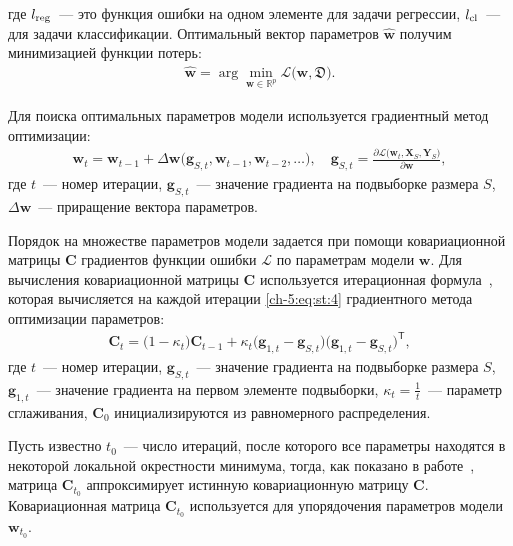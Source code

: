 где $l_{\text{\text{reg}}}$~--- это функция ошибки на одном элементе для задачи регрессии, $l_{\text{\text{cl}}}$~--- для задачи классификации.
Оптимальный вектор параметров $\hat{\textbf{w}}$ получим минимизацией функции потерь:
\[
\label{ch-5:eq:st:0:1}
\begin{aligned}
\hat{\textbf{w}} = \arg \min_{\textbf{w}\in\mathbb{R}^{p}} \mathcal{L}\bigr(\textbf{w}, \mathfrak{D}\bigr).
\end{aligned}
\]

Для поиска оптимальных параметров модели используется градиентный метод оптимизации:
\[
\label{ch-5:eq:st:4}
\begin{aligned}
\textbf{w}_{t} = \textbf{w}_{t-1} + \Delta\textbf{w}\bigr(\textbf{g}_{S,t}, \textbf{w}_{t-1}, \textbf{w}_{t-2}, \ldots\bigr), \quad \textbf{g}_{S,t}=\frac{\partial \mathcal{L}\bigr(\textbf{w}_{t}, \textbf{X}_{S}, \textbf{Y}_{S}\bigr)}{\partial \textbf{w}},
\end{aligned}
\]
где $t$~--- номер итерации, $\textbf{g}_{S,t}$~--- значение градиента на подвыборке размера $S$, $\Delta\textbf{w}$~--- приращение вектора параметров.
 
 
Порядок на множестве параметров модели задается при помощи ковариационной матрицы $\textbf{C}$ градиентов функции ошибки $\mathcal{L}$ по параметрам модели $\textbf{w}$. Для вычисления ковариационной матрицы $\textbf{C}$ используется итерационная формула~\cite{Chunyan2016}, которая вычисляется на каждой итерации \eqref{ch-5:eq:st:4} градиентного метода оптимизации параметров:
\[
\label{ch-5:eq:st:5}
\begin{aligned}
\textbf{C}_t = \bigr(1-\kappa_t\bigr)\textbf{C}_{t-1}+\kappa_t\bigr(\textbf{g}_{1,t}-\textbf{g}_{S,t}\bigr)\bigr(\textbf{g}_{1,t}-\textbf{g}_{S,t}\bigr)^{\mathsf{T}},
\end{aligned}
\]
 где $t$~--- номер итерации, $\textbf{g}_{S,t}$~--- значение градиента на подвыборке размера $S$, $\textbf{g}_{1,t}$~--- значение градиента на первом элементе подвыборки, $\kappa_t=\frac{1}{t}$~--- параметр сглаживания, $\textbf{C}_0$ инициализируются из равномерного распределения.
 
Пусть известно $t_0$~--- число итераций, после которого все параметры находятся в некоторой локальной окрестности минимума, тогда, как показано в работе~\cite{Chunyan2016}, матрица $\textbf{C}_{t_0}$ аппроксимирует истинную ковариационную матрицу $\textbf{C}$. Ковариационная матрица $\textbf{C}_{t_0}$ используется для упорядочения параметров модели $\textbf{w}_{t_0}$. 
 
